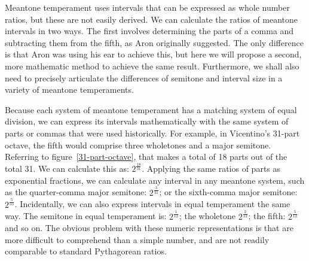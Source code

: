 Meantone temperament uses intervals that can be expressed as whole number ratios, but these are not easily derived. We
can calculate the ratios of meantone intervals in two ways. The first involves determining the parts of a comma and
subtracting them from the fifth, as Aron originally suggested. The only difference is that Aron was using his ear to
achieve this, but here we will propose a second, more mathematic method to achieve the same result. Furthermore, we
shall also need to precisely articulate the differences of semitone and interval size in a variety of meantone
temperaments.

Because each system of meantone temperament has a matching system of equal division, we can express its intervals
mathematically with the same system of parts or commas that were used historically. For example, in Vicentino's 31-part
octave, the fifth would comprise three wholetones and a major semitone. Referring to figure~\ref{31-part-octave}, that
makes a total of 18 parts out of the total 31. We can calculate this as: $2^\frac{18}{31}$. Applying the same ratios
of parts as exponential fractions, we can calculate any interval in any meantone system, such as the quarter-comma major
semitone: $ 2^\frac{3}{31} $; or the sixth-comma major semitone: $ 2^\frac{5}{55} $. Incidentally, we can also express
intervals in equal temperament the same way.  The semitone in equal temperament is: $ 2^\frac{1}{12} $; the wholetone
$ 2^\frac{2}{12} $; the fifth: $ 2^\frac{5}{12} $ and so on. The obvious problem with these numeric representations is
that are more difficult to comprehend than a simple number, and are not readily comparable to standard Pythagorean
ratios.

